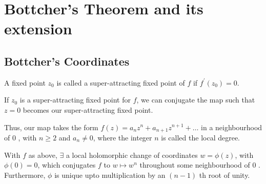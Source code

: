 \chapter{Bottcher's Theorem and its extension}
\section{Bottcher's Coordinates}
A fixed point $z_{0}$ is called a super-attracting fixed point of $f$ if $f^{\prime}\left(z_{0}\right)=0$.

If $z_{0}$ is a super-attracting fixed point for $f$, we can conjugate the map such that $z=0$ becomes our super-attracting fixed point.

Thus, our map takes the form $f(z)=a_{n} z^{n}+a_{n+1} z^{n+1}+\ldots$ in a neighbourhood of 0 , with $n \geq 2$ and $a_{n} \neq 0$, where the integer $n$ is called the local degree.

\begin{theorem}
	With $f$ as above, $\exists$ a local holomorphic change of coordinates $w=\phi(z)$, with $\phi(0)=0$, which conjugates $f$ to $w \mapsto w^{n}$ throughout some neighbourhood of 0 .\\
Furthermore, $\phi$ is unique upto multiplication by an $(n-1)$ th root of unity.
\end{theorem}

